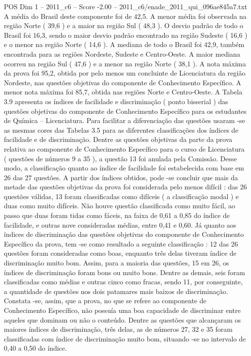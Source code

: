 \begin{textsample}{POS Dim 1 – 2011\_c6 – Score -2.00 – 2011\_c6/enade\_2011\_qui\_096ae845a7.txt}
A média do Brasil deste componente foi de 42,5.
A menor média foi observada na região Norte ( 39,6 ) e a maior na região Sul ( 48,3 ).
O desvio padrão de todo o Brasil foi 16,3, sendo o maior desvio padrão encontrado na região Sudeste ( 16,6 ) e o menor na região Norte ( 14,6 ).
A mediana de todo o Brasil foi 42,9, também encontrada para as regiões Nordeste, Sudeste e Centro-Oeste.
A maior mediana ocorreu na região Sul ( 47,6 ) e a menor na região Norte ( 38,1 ).
A nota máxima da prova foi 95,2, obtida por pelo menos um concluinte de Licenciatura da região Nordeste, nas questões objetivas do componente de Conhecimento Específico.
A menor nota máxima foi 85,7, obtida nas regiões Norte e Centro-Oeste.
A Tabela 3.9 apresenta os índices de facilidade e discriminação ( ponto bisserial ) das questões objetivas do componente de Conhecimento Específico para os estudantes de Química – Licenciatura.
Para facilitar a diferenciação das questões usaram -se as mesmas cores das Tabelas 3.5 para as diferentes classificações dos índices de facilidade e de discriminação.
Dentre as questões objetivas da parte da prova relativa ao componente de Conhecimento Específico para o curso de Licenciatura ( questões de números 9 a 35 ), a questão 13 foi anulada pela Comissão.
Desse modo, a classificação quanto ao índice de facilidade foi estabelecida com base em 26 das 27 questões.
A partir dos índices obtidos, pode -se concluir que mais da metade das questões objetivas da prova foi considerada pelo menos difícil : das 26 questões válidas, 13 foram classificadas como difíceis ( a classificação modal ) e duas como muito difíceis.
Não houve questão classificada como muito fácil, ao passo que duas foram tidas como fáceis, na faixa de 0,61 a 0,85 do índice de facilidade, e outras nove consideradas médias, entre 0,41 e 0,60.
Já quanto aos índices de discriminação das questões objetivas do componente de Conhecimento Específico da prova, tem -se como resultado a seguinte classificação : 12 das 26 questões foram consideradas como boas, enquanto três delas tiveram índice de discriminação muito bom.
Assim, para a maioria das questões, 15 em 26, os índices de discriminação foram bons ou muito bons.
Dentre as demais, seis foram classificadas como médias e outras cinco como fracas, sendo 11, por conseguinte, a quantidade de questões nos dois patamares mais baixos de discriminação.
Constata -se, assim, que a prova, no que se refere ao componente de Conhecimento Específico, não possuía uma boa capacidade de discriminar entre aqueles que dominam ou não o conteúdo.
Dentre as questões que alcançaram os maiores índices de discriminação, três delas, as de números 27, 32 e 35 foram classificadas com índice de discriminação muito bom, situando -se no intervalo de 0,40 a 0,50 do índice.

\end{textsample}
